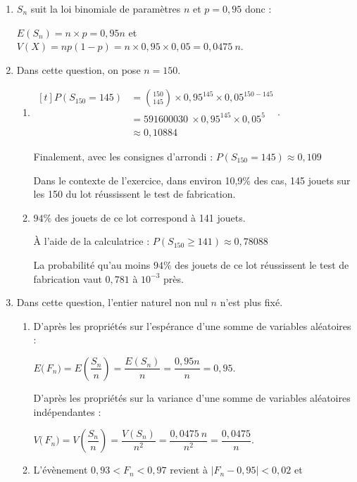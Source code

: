 \documentclass[10pt]{article}
\providecommand{\np}[2][]{{#2~#1}}
\begin{document}
\begin{enumerate}
	\item $S_{n}$ suit la loi binomiale de paramètres $n$ et $p = 0,95$ donc :

$E\left(S_n\right)=n\times p = 0,95n$ \quad et \quad $V(X)=np(1-p)= n \times 0,95 \times 0,05 = \np{0,0475}n$.

	\item Dans cette question, on pose $n = 150$.
	\begin{enumerate}
		\item
		$\begin{aligned}[t] P\left(S_{150}=145\right)
			& = \displaystyle \binom{150}{145}\times 0,95^{145}\times 0,05^{150 - 145}\\
			& = \np{591600030}\times 0,95^{145} \times 0,05^{5}\\
			& \approx \np{0,10884}
		\end{aligned}$.

Finalement, avec les consignes d'arrondi : \quad $P\left(S_{150}= 145\right) \approx 0,109$

Dans le contexte de l'exercice, dans environ 10,9\% des cas, 145 jouets sur les 150 du lot réussissent le test de fabrication.
		\item $94\%$ des jouets de ce lot  correspond à 141 jouets.

À l'aide de la calculatrice : $P\left(S_{150} \geqslant 141\right) \approx \np{0,78088}$

		La probabilité qu'au moins $94\%$ des jouets de ce lot réussissent le test de fabrication vaut $0,781$ à $10^{-3}$ près.
	\end{enumerate}

	\item Dans cette question, l'entier naturel non nul $n$ n'est plus fixé.

	\begin{enumerate}
		\item D'après les propriétés sur l'espérance d'une somme de variables aléatoires :

$E\big(\,F_{n}\big)= E\left(\dfrac{S_{n}}{n}\right) = \dfrac{E\left( S_{n}\right)}{n}= \dfrac{0,95n}{n}= 0,95 $.

D'après les propriétés sur la variance d'une somme de variables aléatoires indépendantes :

$V\big(\,F_{n}\big)= V\left(\dfrac{S_{n}}{n}\right) = \dfrac{V\left( S_{n}\right)}{n^2}= \dfrac{\np{0,0475}n}{n^2}= \dfrac{0,0475}{n}$.

	\item L'évènement \og $0,93 <F_{n}< 0,97$ \fg{} revient à $\big|F_{n} - 0,95 \big| < 0,02$ et


\end{enumerate}
\end{enumerate}
\end{document}
